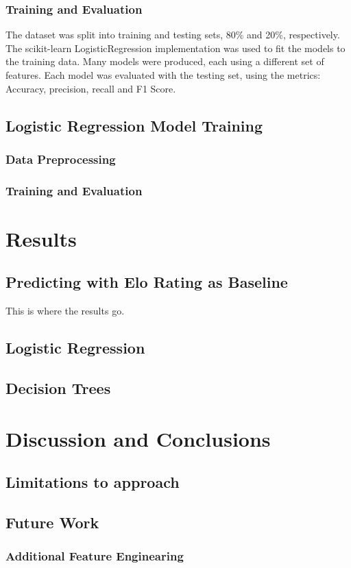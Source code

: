 \documentclass[12pt]{article}
\begin{document}
\subsubsection{Training and Evaluation}

The dataset was split into training and testing sets, 80\% and 20\%, respectively. The scikit-learn LogisticRegression implementation was used to fit the models to the training data. Many models were produced, each using a different set of features. Each model was evaluated with the testing set, using the metrics: Accuracy, precision, recall and F1 Score.

\subsection{Logistic Regression Model Training}

\subsubsection{Data Preprocessing}

\subsubsection{Training and Evaluation}

\section{Results}

\subsection{Predicting with Elo Rating as Baseline}
This is where the results go.

\subsection{Logistic Regression}

\subsection{Decision Trees}

\section{Discussion and Conclusions}

\subsection{Limitations to approach}

\subsection{Future Work}

\subsubsection{Additional Feature Enginearing}
\newpage

\end{document}
